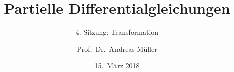 \documentclass[handout]{beamer}
\title[]{Partielle Differentialgleichungen}
\subtitle{4. Sitzung: Transformation}
\date[15.~März 2018]{15.~März 2018}
\author{Prof.~Dr.~Andreas Müller}
\begin{document}
\begin{frame}
\titlepage

\end{frame}


\end{document}
